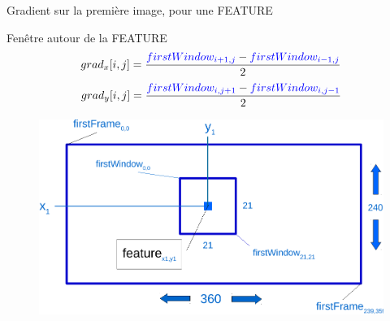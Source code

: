\documentclass{bredelebeamer}
\begin{document}

\begin{frame}{Gradient sur la première image, pour une FEATURE}

	\begin{block}{Fen\^etre autour de la FEATURE}
 $$grad_{x}[i,j] = \frac{\textcolor{blue}{firstWindow_{i+1,j}} - \textcolor{blue}{firstWindow_{i-1,j}}}{2}$$
 $$grad_{y}[i,j] = \frac{\textcolor{blue}{firstWindow_{i,j+1}} - \textcolor{blue}{firstWindow_{i,j-1}}}{2}$$
\end{block}

\begin{figure}
\centering
\includegraphics[scale=0.3]{images/firstFrameWindow.pdf}
\end{figure}

\end{frame}

\end{document}
